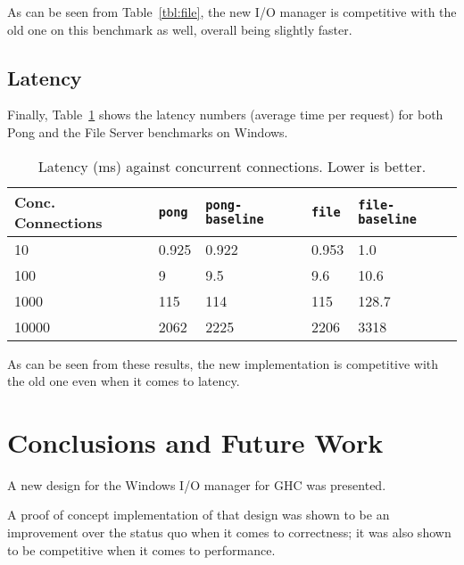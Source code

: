 \documentclass[a4paper,11pt,oneside]{report}
\begin{document}
As can be seen from Table~\ref{tbl:file}, the new I/O manager is competitive
with the old one on this benchmark as well, overall being slightly faster.

\section{Latency}

Finally, Table~\ref{tbl:latency} shows the latency numbers (average time per
request) for both Pong and the File Server benchmarks on Windows.

\begin{table}[h!]
\centering
\begin{tabular}{ | l | l | l | l | l | }
\hline
Conc. Connections &  \texttt{pong}  & \texttt{pong-baseline} & \texttt{file} &
\texttt{file-baseline} \\
\hline
10 &     0.925 &   0.922 &         0.953 & 1.0\\
\hline
100 &     9 &      9.5 &           9.6 &   10.6\\
\hline
1000 &    115 &    114 &          115  & 128.7\\
\hline
10000 &  2062 &   2225 &         2206  & 3318\\
\hline
\end{tabular}
\caption{Latency (ms) against concurrent connections. Lower is better. }
\label{tbl:latency}
\end{table}

As can be seen from these results, the new implementation is competitive with
the old one even when it comes to latency.




\chapter{Conclusions and Future Work}
\label{chap:conclusions}

A new design for the Windows I/O manager for GHC was presented.

A proof of concept implementation of that design was shown to be an improvement
over the status quo when it comes to correctness; it was also shown to be
competitive when it comes to performance.
\end{document}
